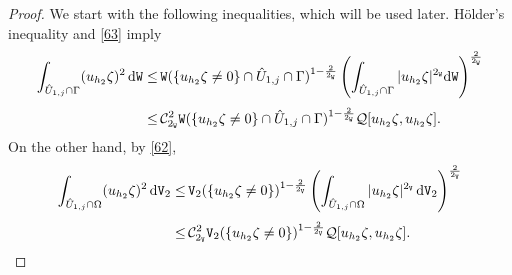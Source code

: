\documentclass[reqno, 11pt, a4paper]{amsart}
\numberwithin{equation}{section}
\newcommand{\ops}{\mathcal{Q}}
\newcommand{\xv}{2_{\mathtt{V}}}
\newcommand{\xw}{2_{\mathtt{W}}}
\newcommand{\wghtv}{\mathtt{V}}
\newcommand{\wghtw}{\mathtt{W}}
\newcommand{\dwv}{\textnormal{d} \mathtt{V}}
\newcommand{\dww}{\textnormal{d} \mathtt{W}}
\begin{document}
\begin{proof} We start with the following inequalities, which will be used later. Hölder's inequality and \eqref{63} imply
\begin{equation} \label{aecontb1}
\begin{aligned}
 \int _{\hat U _{1,j} \cap \Gamma }  (u_{h_{2}}  \zeta )^2 \, \dww \leq & \displaystyle \,  \wghtw  (\{ u_{h_{2}}  \zeta \neq 0 \} \cap \hat U _{1,j} \cap \Gamma )^{1-\frac{2}{\xw}}\left( \int _{\hat U _{1,j} \cap \Gamma }  | u_{h_{2}}  \zeta |^{\xw} \dww \right)^{\frac{2}{\xw}} \\[3pt]
  \leq  & \displaystyle \,  \mathcal{C} ^2 _{\xw} \wghtw  ( \{ u_{h_{2}}  \zeta \neq 0 \}\cap \hat U _{1,j} \cap \Gamma )^{1-\frac{2}{\xw}} \ops [ u_{h_{2}}  \zeta , u_{h_{2}}  \zeta].
 \end{aligned}
\end{equation}
On the other hand, by  \eqref{62},
\begin{equation} \label{aecontb2}
\begin{aligned}
 \int _{\hat U _{1,j} \cap \Omega } (u_{h_{2}}  \zeta )^2 \, \dwv _{2} \leq & \displaystyle \,  \wghtv _{2}  (\{ u_{h_{2}}  \zeta \neq 0 \}  )^{1-\frac{2}{\xv}}\left( \int _{\hat U _{1,j} \cap \Omega } | u_{h_{2}}  \zeta |^{\xv} \, \dwv _{2} \right)^{\frac{2}{\xv}} \\[3pt]
  \leq & \displaystyle \,  \mathcal{C} ^2 _{\xv} \wghtv _{2}  ( \{ u_{h_{2}}  \zeta \neq 0 \} )^{1-\frac{2}{\xv}} \ops [ u_{h_{2}}  \zeta , u_{h_{2}}  \zeta].
 \end{aligned}
\end{equation}

\medskip


\end{proof}
\end{document}
